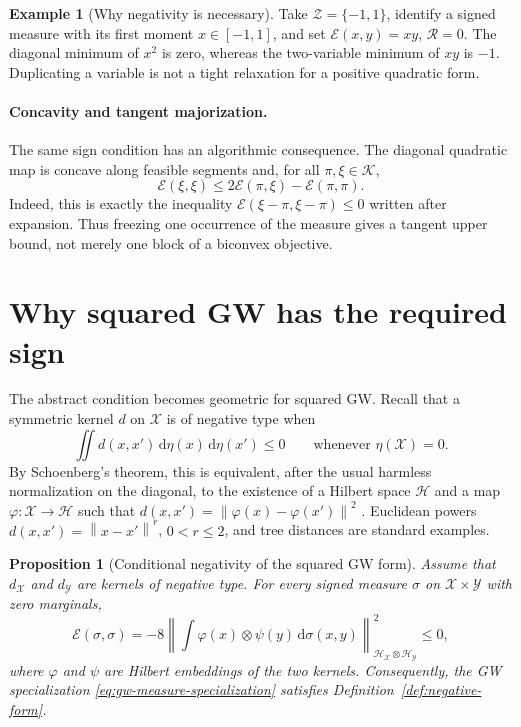 \documentclass[11pt]{article}
\newtheorem{proposition}[theorem]{Proposition}
\theoremstyle{definition}
\newtheorem{example}[theorem]{Example}
\theoremstyle{remark}
\newcommand{\Kcal}{\mathcal K}
\newcommand{\Ee}{\mathcal E}
\newcommand{\Rcal}{\mathcal R}
\newcommand{\dd}{\,\mathrm d}
\newcommand{\norm}[1]{\left\lVert #1\right\rVert}
\begin{document}
\begin{example}[Why negativity is necessary]
Take \(\mathcal Z=\{-1,1\}\), identify a signed measure with its first
moment \(x\in[-1,1]\), and set \(\Ee(x,y)=xy\), \(\Rcal=0\).  The diagonal
minimum of \(x^2\) is zero, whereas the two-variable minimum of \(xy\) is
\(-1\).  Duplicating a variable is not a tight relaxation for a positive
quadratic form.
\end{example}

\paragraph{Concavity and tangent majorization.}
The same sign condition has an algorithmic consequence.  The diagonal
quadratic map is concave along feasible segments and, for all
\(\pi,\xi\in\Kcal\),
\begin{equation}\label{eq:measure-tangent-majorization}
  \Ee(\xi,\xi)
  \leq
  2\Ee(\pi,\xi)-\Ee(\pi,\pi).
\end{equation}
Indeed, this is exactly the inequality
\(
 \Ee(\xi-\pi,\xi-\pi)\leq0
\)
written after expansion.  Thus freezing one occurrence of the measure gives
a tangent upper bound, not merely one block of a biconvex objective.

\section{Why squared GW has the required sign}
\label{sec:negative-type}

The abstract condition becomes geometric for squared GW.  Recall that a
symmetric kernel \(d\) on \(\mathcal X\) is of negative type when
\begin{equation}\label{eq:negative-type-kernel}
  \iint d(x,x')\dd\eta(x)\dd\eta(x')\leq0
  \qquad
  \text{whenever }\eta(\mathcal X)=0.
\end{equation}
By Schoenberg's theorem, this is equivalent, after the usual harmless
normalization on the diagonal, to the existence of a Hilbert space
\(\mathcal H\) and a map \(\varphi:\mathcal X\to\mathcal H\) such that
\(
 d(x,x')=\norm{\varphi(x)-\varphi(x')}^2
\)
\citep{Schoenberg1938}.  Euclidean powers
\(d(x,x')=\norm{x-x'}^r\), \(0<r\leq2\), and tree distances are standard
examples.

\begin{proposition}[Conditional negativity of the squared GW form]
\label{prop:measure-gw-negative}
Assume that \(d_{\mathcal X}\) and \(d_{\mathcal Y}\) are kernels of
negative type.  For every signed measure \(\sigma\) on
\(\mathcal X\times\mathcal Y\) with zero marginals,
\begin{equation}\label{eq:measure-gw-negative-square}
  \Ee(\sigma,\sigma)
  =
  -8
  \left\|
    \int
    \varphi(x)\otimes\psi(y)\dd\sigma(x,y)
  \right\|_{\mathcal H_{\mathcal X}\otimes\mathcal H_{\mathcal Y}}^2
  \leq0,
\end{equation}
where \(\varphi\) and \(\psi\) are Hilbert embeddings of the two kernels.
Consequently, the GW specialization \eqref{eq:gw-measure-specialization}
satisfies Definition~\ref{def:negative-form}.
\end{proposition}
\end{document}
